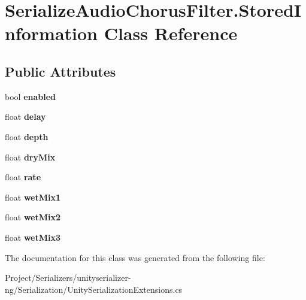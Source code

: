 \hypertarget{class_serialize_audio_chorus_filter_1_1_stored_information}{}\section{Serialize\+Audio\+Chorus\+Filter.\+Stored\+Information Class Reference}
\label{class_serialize_audio_chorus_filter_1_1_stored_information}
\subsection*{Public Attributes}
\begin{DoxyCompactItemize}
\item 
\mbox{\label{class_serialize_audio_chorus_filter_1_1_stored_information_a9e6e54b87aafc288b49b198ee8abd1aa}} 
bool {\bfseries enabled}
\item 
\mbox{\label{class_serialize_audio_chorus_filter_1_1_stored_information_a5a256c9e16fea744323e229e0d1eed08}} 
float {\bfseries delay}
\item 
\mbox{\label{class_serialize_audio_chorus_filter_1_1_stored_information_ac53fe467363b00bd81c361acffd5d861}} 
float {\bfseries depth}
\item 
\mbox{\label{class_serialize_audio_chorus_filter_1_1_stored_information_a5366a60b33459e5100f35c936c233098}} 
float {\bfseries dry\+Mix}
\item 
\mbox{\label{class_serialize_audio_chorus_filter_1_1_stored_information_a17748d9695582fdd85f2062bee5e7b86}} 
float {\bfseries rate}
\item 
\mbox{\label{class_serialize_audio_chorus_filter_1_1_stored_information_a4061e193d1d922ee70c0d8f70605d45a}} 
float {\bfseries wet\+Mix1}
\item 
\mbox{\label{class_serialize_audio_chorus_filter_1_1_stored_information_add1ee35205ef5351c850f19facb55939}} 
float {\bfseries wet\+Mix2}
\item 
\mbox{\label{class_serialize_audio_chorus_filter_1_1_stored_information_afb8d496454766a56b05b4b25f2d1efa7}} 
float {\bfseries wet\+Mix3}
\end{DoxyCompactItemize}


The documentation for this class was generated from the following file\+:\begin{DoxyCompactItemize}
\item 
Project/\+Serializers/unityserializer-\/ng/\+Serialization/Unity\+Serialization\+Extensions.\+cs\end{DoxyCompactItemize}
